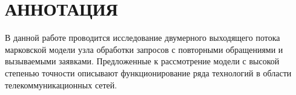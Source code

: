 \section*{\normalsize\centering АННОТАЦИЯ}
В данной работе проводится исследование двумерного выходящего потока марковской модели узла обработки запросов с повторными обращениями и вызываемыми заявками. Предложенные к рассмотрение модели с высокой степенью точности описывают функционирование ряда технологий в области телекоммуникационных сетей.



\thispagestyle{empty} %
\clearpage